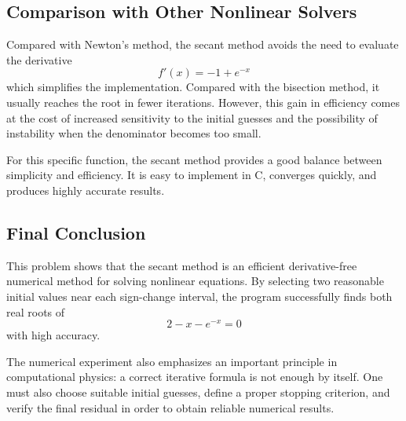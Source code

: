 \documentclass[12pt,a4paper]{article}
\begin{document}
\subsection*{Comparison with Other Nonlinear Solvers}

Compared with Newton's method, the secant method avoids the need to evaluate the derivative
\[
f'(x)=-1+e^{-x}
\]
which simplifies the implementation. Compared with the bisection method, it usually reaches the root in fewer iterations. However, this gain in efficiency comes at the cost of increased sensitivity to the initial guesses and the possibility of instability when the denominator becomes too small.

For this specific function, the secant method provides a good balance between simplicity and efficiency. It is easy to implement in C, converges quickly, and produces highly accurate results.

\subsection*{Final Conclusion}

This problem shows that the secant method is an efficient derivative-free numerical method for solving nonlinear equations. By selecting two reasonable initial values near each sign-change interval, the program successfully finds both real roots of
\[
2-x-e^{-x}=0
\]
with high accuracy.

The numerical experiment also emphasizes an important principle in computational physics: a correct iterative formula is not enough by itself. One must also choose suitable initial guesses, define a proper stopping criterion, and verify the final residual in order to obtain reliable numerical results.
\end{document}
